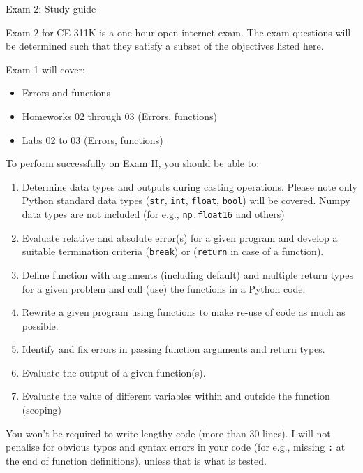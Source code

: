 \documentclass[]{article}
\begin{document}
\begin{center}
\Large Exam 2: Study guide
\end{center}

Exam 2 for CE 311K is a one-hour open-internet exam. The exam questions will be determined such that they satisfy a subset of the objectives listed here.

Exam 1 will cover:
\begin{itemize}
	\item Errors and functions
	\item Homeworks 02 through 03 (Errors, functions)
	\item Labs 02 to 03 (Errors, functions)
\end{itemize}

To perform successfully on Exam II, you should be able to:

\begin{enumerate}
	\item Determine data types and outputs during casting operations. Please note only Python standard data types (\verb|str|, \verb|int|, \verb|float|, \verb|bool|) will be covered. Numpy data types are not included (for e.g., \verb|np.float16| and others)
	\item Evaluate relative and absolute error(s) for a given program and develop  a suitable termination criteria (\verb|break|) or (\verb|return| in case of a function).
	\item Define function with arguments (including default) and multiple return types for a given problem and call (use) the functions in a Python code.
	\item Rewrite a given program using functions to make re-use of code as much as possible.
	\item Identify and fix errors in passing function arguments and return types.
	\item Evaluate the output of a given function(s).
	\item Evaluate the value of different variables within and outside the function (scoping)
%
%
\end{enumerate}

You won't be required to write lengthy code (more than 30 lines). I will not penalise for obvious typos and syntax errors in your code (for e.g., missing \verb|:| at the end of function definitions), unless that is what is tested.
\end{document}
